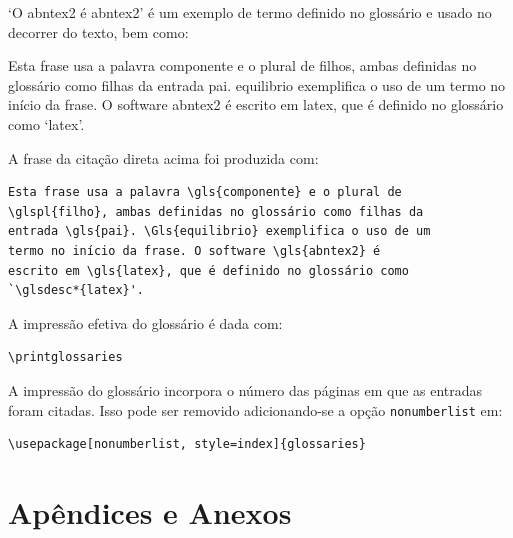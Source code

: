 `O \gls{abntex2} é \glsdesc*{abntex2}' é um exemplo de termo definido no glossário e usado no decorrer do texto, bem como:

\begin{citacao}%
Esta frase usa a palavra \gls{componente} e o plural de \glspl{filho}, ambas definidas no glossário como filhas da entrada \gls{pai}. \Gls{equilibrio} exemplifica o uso de um termo no início da frase. O software \gls{abntex2} é escrito em \gls{latex}, que é definido no glossário como `\glsdesc*{latex}'.
\end{citacao}

A frase da citação direta acima foi produzida com:

\begin{SingleSpacing}%
\begin{verbatim}
Esta frase usa a palavra \gls{componente} e o plural de
\glspl{filho}, ambas definidas no glossário como filhas da
entrada \gls{pai}. \Gls{equilibrio} exemplifica o uso de um
termo no início da frase. O software \gls{abntex2} é
escrito em \gls{latex}, que é definido no glossário como
`\glsdesc*{latex}'.
\end{verbatim}
\end{SingleSpacing}

A impressão efetiva do glossário é dada com:

\begin{SingleSpacing}%
\begin{verbatim}
\printglossaries
\end{verbatim}
\end{SingleSpacing}

A impressão do glossário incorpora o número das páginas em que as entradas foram citadas. Isso pode ser removido adicionando-se a opção \texttt{nonumberlist} em:

\begin{SingleSpacing}%
\begin{verbatim}
\usepackage[nonumberlist, style=index]{glossaries}
\end{verbatim}
\end{SingleSpacing}

\section{Apêndices e Anexos}\label{sec:apendiceseanexos}

